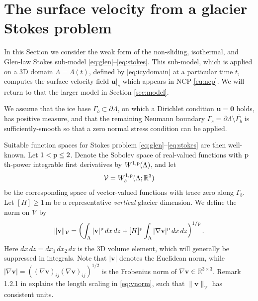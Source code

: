 \documentclass[hidelinks,onefignum,onetabnum,final]{siamart220329}  %
\newcommand{\RR}{\mathbb{R}}
\newcommand{\grad}{\nabla}
\newcommand{\bu}{\mathbf{u}}
\newcommand{\bv}{\mathbf{v}}
\newcommand{\bzero}{\bm{0}}
\newcommand{\cV}{\mathcal{V}}
\newcommand{\pp}{{\text{\textnormal{p}}}}
\begin{document}
\section{The surface velocity from a glacier Stokes problem} \label{sec:stokes}

In this Section we consider the weak form of the non-sliding, isothermal, and Glen-law Stokes sub-model \eqref{eq:glen}--\eqref{eq:stokes}.  This sub-model, which is applied on a 3D domain $\Lambda = \Lambda(t)$, defined by \eqref{eq:icydomain} at a particular time $t$, computes the surface velocity field $\bu|_s$ which appears in NCP \eqref{eq:ncp}.  We will return to that the larger model in Section \ref{sec:model}.

We assume that the ice base $\Gamma_b\subset\partial \Lambda$, on which a Dirichlet condition $\bu=\bzero$ holds, has positive measure, and that the remaining Neumann boundary $\Gamma_s = \partial \Lambda \setminus \overline{\Gamma_b}$ is sufficiently-smooth so that a zero normal stress condition can be applied.

Suitable function spaces for Stokes problem \eqref{eq:glen}--\eqref{eq:stokes} are then well-known.  Let $1 < \pp \le 2$.  Denote the Sobolev space \cite{Evans2010} of real-valued functions with $\pp$th-power integrable first derivatives by $W^{1,\pp}(\Lambda)$, and let
\begin{equation}
\cV = W_b^{1,\pp}(\Lambda; \RR^3) \label{eq:defineV}
\end{equation}
be the corresponding space of vector-valued functions with trace zero along $\Gamma_b$.  Let $[H]\ge 1\,\text{m}$ be a representative \emph{vertical} glacier dimension.  We define the norm on $\cV$ by
\begin{equation}
\|\bv\|_{\cV} = \left(\int_\Lambda |\bv|^\pp\,dx\,dz + [H]^\pp \int_\Lambda |\grad\bv|^\pp\,dx\,dz\right)^{1/\pp}. \label{eq:vnorm}
\end{equation}
Here $dx\,dz = dx_1\,dx_2\,dz$ is the 3D volume element, which will generally be suppressed in integrals.  Note that $|\bv|$ denotes the Euclidean norm, while $|\grad\bv|=\left((\grad\bv)_{ij} (\grad\bv)_{ij}\right)^{1/2}$ is the Frobenius norm of $\grad\bv\in\RR^{3\times 3}$.  Remark 1.2.1 in \cite{BoffiBrezziFortin2013} explains the length scaling in \eqref{eq:vnorm}, such that $\|\bv\|_{\cV}$ has consistent units.
\end{document}
